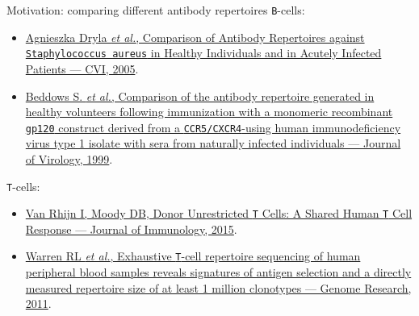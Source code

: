 \documentclass{beamer}\usepackage[]{graphicx}\usepackage[]{color}
\begin{document}
\begin{frame}{Motivation: comparing different antibody repertoires}
  \texttt{B}-cells:
  {\footnotesize
  \begin{itemize}
    \item \href{http://www.ncbi.nlm.nih.gov/pmc/articles/PMC1065207/}{Agnieszka Dryla \textit{et al.}, Comparison of Antibody Repertoires against \texttt{Staphylococcus aureus} in 
      Healthy Individuals and in Acutely Infected Patients --- CVI, 2005}.
  
    \item \href{http://www.ncbi.nlm.nih.gov/pubmed/9882391}{Beddows S. \textit{et al.}, Comparison of the antibody repertoire generated in healthy volunteers following immunization with a monomeric recombinant \texttt{gp120} 
      construct derived from a \texttt{CCR5/CXCR4}-using human immunodeficiency virus type 1 isolate with sera from naturally infected individuals ---  Journal of Virology, 1999}. 
  \end{itemize}
  }

  \bigskip
  \texttt{T}-cells:
  
  { \footnotesize
  \begin{itemize}
    \item \href{http://www.ncbi.nlm.nih.gov/pubmed/26297792}{Van Rhijn I, Moody DB, Donor Unrestricted \texttt{T} Cells: A Shared Human \texttt{T} Cell Response --- Journal of Immunology, 2015}.
    \item \href{http://www.ncbi.nlm.nih.gov/pubmed/21349924}{Warren RL \textit{et al.}, Exhaustive \texttt{T}-cell repertoire sequencing of human peripheral blood samples reveals 
      signatures of antigen selection and a directly measured repertoire size of at least 1 million clonotypes --- Genome Research, 2011}.
  \end{itemize}
  }
\end{frame}
\end{document}
